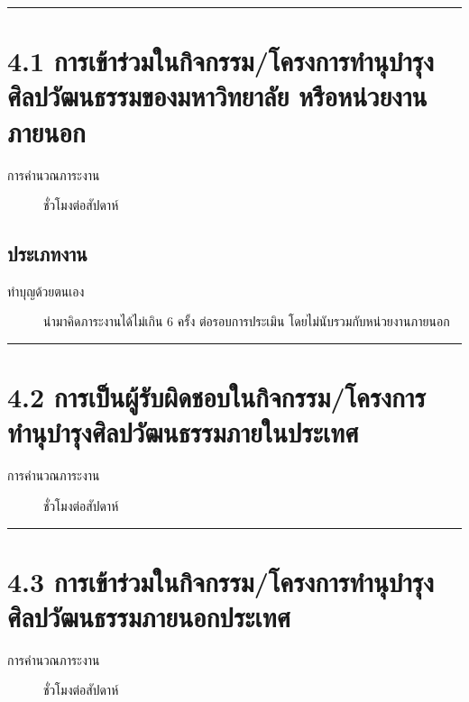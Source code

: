 \documentclass[a4paper,12pt,english]{sphinxmanual}
\begin{document}
\bigskip\hrule\bigskip



\section{4.1 การเข้าร่วมในกิจกรรม/โครงการทำนุบำรุงศิลปวัฒนธรรมของมหาวิทยาลัย หรือหน่วยงานภายนอก}
\label{\detokenize{4culture:id4}}\label{\detokenize{4culture:id5}}\begin{description}
\item[{การคำนวณภาระงาน}]  ชั่วโมงต่อสัปดาห์

\end{description}


\subsection{ประเภทงาน}
\label{\detokenize{4culture:id6}}\begin{description}
\item[{ทำบุญด้วยตนเอง}] \leavevmode
นำมาคิดภาระงานได้ไม่เกิน 6 ครั้ง ต่อรอบการประเมิน โดยไม่นับรวมกับหน่วยงานภายนอก

\end{description}


\bigskip\hrule\bigskip



\section{4.2 การเป็นผู้รับผิดชอบในกิจกรรม/โครงการทำนุบำรุงศิลปวัฒนธรรมภายในประเทศ}
\label{\detokenize{4culture:id7}}\label{\detokenize{4culture:id8}}\begin{description}
\item[{การคำนวณภาระงาน}]  ชั่วโมงต่อสัปดาห์

\end{description}


\bigskip\hrule\bigskip



\section{4.3 การเข้าร่วมในกิจกรรม/โครงการทำนุบำรุงศิลปวัฒนธรรมภายนอกประเทศ}
\label{\detokenize{4culture:id9}}\label{\detokenize{4culture:id10}}\begin{description}
\item[{การคำนวณภาระงาน}]  ชั่วโมงต่อสัปดาห์

\end{description}
\end{document}
